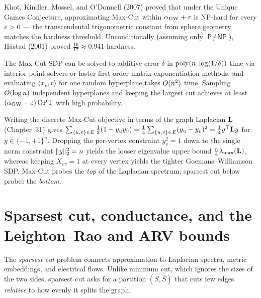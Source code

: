 \begin{marginnotebox}
Khot, Kindler, Mossel, and O'Donnell (2007) proved that under the Unique Games Conjecture, approximating
Max-Cut within $\alpha_{\mathrm{GW}}+\varepsilon$ is \textsf{NP}-hard for every $\varepsilon>0$ --- the transcendental
trigonometric constant from sphere geometry matches the hardness threshold. Unconditionally (assuming only
$\textsf{P}\neq\textsf{NP}$), H\aa stad (2001) proved $\tfrac{16}{17}\approx 0.941$-hardness.
\end{marginnotebox}

\begin{complexitybox}
The Max-Cut SDP can be solved to additive error $\delta$ in $\operatorname{poly}(n,\log(1/\delta))$ time via interior-point
solvers or faster first-order matrix-exponentiation methods, and evaluating $\langle x_v,r\rangle$ for one
random hyperplane takes $O(n^2)$ time. Sampling $O(\log n)$ independent hyperplanes and keeping the
largest cut achieves at least $(\alpha_{\mathrm{GW}}-\varepsilon)\,\mathrm{OPT}$ with high probability.
\end{complexitybox}

\begin{connectionbox}
Writing the discrete Max-Cut objective in terms of the graph Laplacian $\mathbf{L}$ (Chapter~31) gives
$\sum_{\{u,v\}\in E}\tfrac12(1-y_u y_v) = \tfrac14\sum_{\{u,v\}\in E}(y_u-y_v)^2 = \tfrac14 y^\top\mathbf{L} y$
for $y\in\{-1,+1\}^n$. Dropping the per-vertex constraint $y_v^2=1$ down to the single norm constraint
$\lVert y\rVert_2^2 = n$ yields the looser eigenvalue upper bound $\tfrac{n}{4}\lambda_{\max}(\mathbf{L})$, whereas
keeping $X_{vv}=1$ at every vertex yields the tighter Goemans--Williamson SDP. Max-Cut probes the
\emph{top} of the Laplacian spectrum; sparsest cut below probes the \emph{bottom}.
\end{connectionbox}

\section{Sparsest cut, conductance, and the Leighton--Rao and ARV bounds}

The \emph{sparsest cut} problem connects approximation to Laplacian spectra, metric embeddings, and
electrical flows. Unlike minimum cut, which ignores the sizes of the two sides, sparsest cut asks for a
partition $(S,\bar S)$ that cuts few edges \emph{relative} to how evenly it splits the graph.

